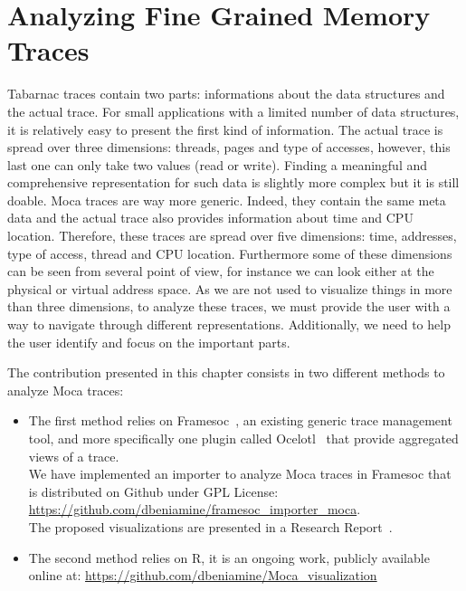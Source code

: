 \chapter{Analyzing Fine Grained Memory Traces}

\gls{Tabarnac} traces contain two parts: informations about the data structures and the actual trace.
For small applications with a limited number of data structures, it is relatively easy to present the first kind of information.
The actual trace is spread over three dimensions: threads, pages and type of accesses, however, this last one can only take two values (read or write).
Finding a meaningful and comprehensive representation for such data is slightly more complex but it is still doable.
\gls{Moca} traces are way more generic.
Indeed, they contain the same meta data and the actual trace also provides information about time and \gls{CPU} location.
Therefore, these traces are spread over five dimensions: time, addresses, type of access, thread and \gls{CPU} location.
Furthermore some of these dimensions can be seen from several point of view, for instance we can look either at the physical or virtual address space.
As we are not used to visualize things in more than three dimensions, to analyze these traces, we must provide the user with a way to navigate through different representations.
Additionally, we need to help the user identify and focus on the important parts.

The contribution presented in this chapter consists in two different methods to analyze \gls{Moca} traces:
\begin{itemize}
    \item The first method relies on \gls{Framesoc}~\cite{Pagano14frameSoC}, an existing generic trace management tool, and more specifically one plugin called \gls{Ocelotl}~\cite{Dosimont14Ocelotl} that provide aggregated views of a trace.\\
        We have implemented an importer to analyze \gls{Moca} traces in \gls{Framesoc} that is distributed on Github under GPL License:\\
        \url{https://github.com/dbeniamine/framesoc\_importer\_moca}.\\
        The proposed visualizations are presented in a Research Report~\cite{Beniamine15Memory}.
    \item The second method relies on \gls{R}, it is an ongoing work, publicly available online at:
        \url{https://github.com/dbeniamine/Moca\_visualization}
\end{itemize}

